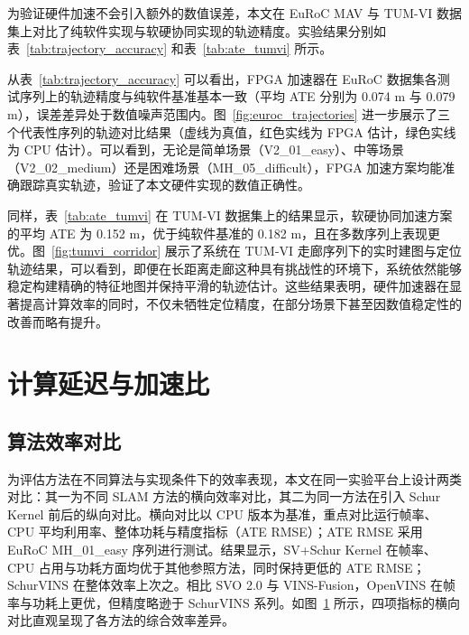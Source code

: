 为验证硬件加速不会引入额外的数值误差，本文在 EuRoC MAV 与 TUM-VI 数据集上对比了纯软件实现与软硬协同实现的轨迹精度。实验结果分别如表~\ref{tab:trajectory_accuracy} 和表~\ref{tab:ate_tumvi} 所示。

从表~\ref{tab:trajectory_accuracy} 可以看出，FPGA 加速器在 EuRoC 数据集各测试序列上的轨迹精度与纯软件基准基本一致（平均 ATE 分别为 0.074 m 与 0.079 m），误差差异处于数值噪声范围内。图~\ref{fig:euroc_trajectories} 进一步展示了三个代表性序列的轨迹对比结果（虚线为真值，红色实线为 FPGA 估计，绿色实线为 CPU 估计）。可以看到，无论是简单场景（V2\_01\_easy）、中等场景（V2\_02\_medium）还是困难场景（MH\_05\_difficult），FPGA 加速方案均能准确跟踪真实轨迹，验证了本文硬件实现的数值正确性。

同样，表~\ref{tab:ate_tumvi} 在 TUM-VI 数据集上的结果显示，软硬协同加速方案的平均 ATE 为 0.152 m，优于纯软件基准的 0.182 m，且在多数序列上表现更优。图~\ref{fig:tumvi_corridor} 展示了系统在 TUM-VI 走廊序列下的实时建图与定位轨迹结果，可以看到，即便在长距离走廊这种具有挑战性的环境下，系统依然能够稳定构建精确的特征地图并保持平滑的轨迹估计。这些结果表明，硬件加速器在显著提高计算效率的同时，不仅未牺牲定位精度，在部分场景下甚至因数值稳定性的改善而略有提升。

\section{计算延迟与加速比}

\subsection{算法效率对比}

为评估方法在不同算法与实现条件下的效率表现，本文在同一实验平台上设计两类对比：其一为不同 SLAM 方法的横向效率对比，其二为同一方法在引入 Schur Kernel 前后的纵向对比。横向对比以 CPU 版本为基准，重点对比运行帧率、CPU 平均利用率、整体功耗与精度指标（ATE RMSE）；ATE RMSE 采用 EuRoC MH\_01\_easy 序列进行测试。结果显示，SV+Schur Kernel 在帧率、CPU 占用与功耗方面均优于其他参照方法，同时保持更低的 ATE RMSE；SchurVINS 在整体效率上次之。相比 SVO 2.0 与 VINS-Fusion，OpenVINS 在帧率与功耗上更优，但精度略逊于 SchurVINS 系列。如图~\ref{fig:efficiency_barplots} 所示，四项指标的横向对比直观呈现了各方法的综合效率差异。

\begin{figure}[h!t]
\centering
\resizebox{0.95\linewidth}{!}{}
\label{fig:efficiency_barplots}
\end{figure}

